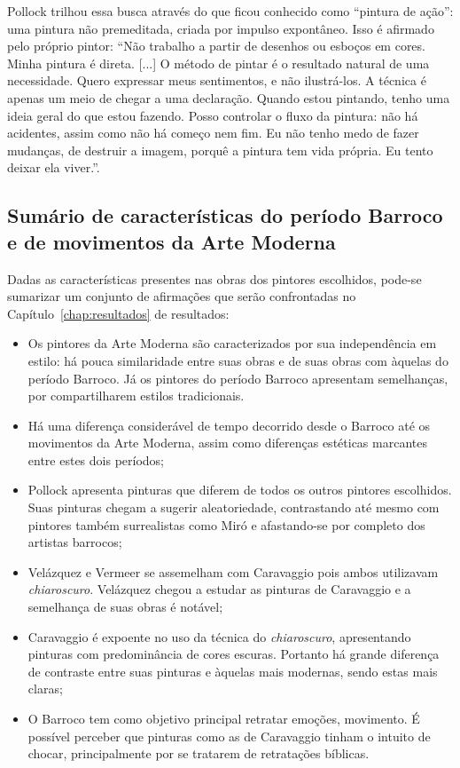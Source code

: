 Pollock trilhou essa busca
através do que ficou conhecido como ``pintura de ação'': uma pintura
não premeditada, criada por impulso expontâneo. Isso é afirmado pelo
próprio pintor: ``Não trabalho a partir de desenhos ou esboços em
cores. Minha pintura é direta. [...] O método de pintar é o resultado
natural de uma necessidade. Quero expressar meus sentimentos, e não
ilustrá-los. A técnica é apenas um meio de chegar a uma
declaração. Quando estou pintando, tenho uma ideia geral do que estou
fazendo. Posso controlar o fluxo da pintura: não há acidentes, assim
como não há começo nem fim. Eu não tenho medo de fazer mudanças, de
destruir a imagem, porquê a pintura tem vida própria. Eu tento deixar
ela viver.''.~\cite{pollock}

\subsection{Sumário de características do período Barroco e de movimentos da Arte Moderna}
\label{subsec:sumario}

Dadas as características presentes nas obras dos pintores escolhidos,
pode-se sumarizar um conjunto de afirmações que serão
confrontadas no Capítulo~\ref{chap:resultados} de resultados:

\begin{itemize}
\item Os pintores da Arte Moderna são caracterizados por sua
  independência em estilo: há pouca similaridade entre suas obras e de
  suas obras com àquelas do período Barroco. Já os pintores do período
  Barroco apresentam semelhanças, por compartilharem estilos
  tradicionais.

\item Há uma diferença considerável de tempo decorrido desde o Barroco
  até os movimentos da Arte Moderna, assim como diferenças estéticas
  marcantes entre estes dois períodos;

\item Pollock apresenta pinturas que diferem de todos os outros
  pintores escolhidos. Suas pinturas chegam a sugerir aleatoriedade,
  contrastando até mesmo com pintores também surrealistas como Miró e
  afastando-se por completo dos artistas barrocos;

\item Velázquez e Vermeer se assemelham com Caravaggio pois ambos
  utilizavam \textit{chiaroscuro}. Velázquez chegou a estudar as
  pinturas de Caravaggio e a semelhança de suas obras é notável;

\item Caravaggio é expoente no uso da técnica do
  \textit{chiaroscuro}, apresentando pinturas com predominância de
  cores escuras. Portanto há grande diferença de contraste entre suas
  pinturas e àquelas mais modernas, sendo estas mais claras;

\item O Barroco tem como objetivo principal retratar emoções,
  movimento. É possível perceber que pinturas como as de Caravaggio
  tinham o intuito de chocar, principalmente por se tratarem de
  retratações bíblicas.
\end{itemize}

